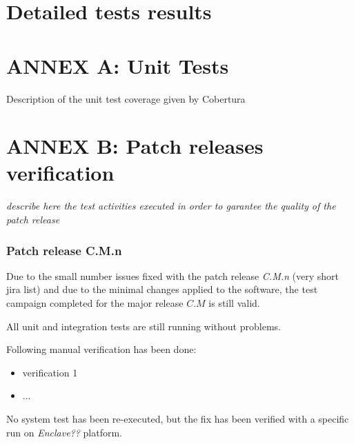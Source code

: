 \documentclass[DM,lsstdraft,STR,toc]{lsstdoc}
\begin{document}
\newpage

\appendix

\newpage
\section{Detailed tests results \label{sect:results}}








\newpage
\section{ANNEX A: Unit Tests \label{sect:unit_tests}}
Description of the unit test coverage given by Cobertura

\newpage
\section{ANNEX B: Patch releases verification}

{\it describe here the test activities executed in order to garantee the quality of the patch release}

\subsubsection{Patch release C.M.n}

Due to the small number issues fixed with the {\it \product} patch release {\it C.M.n} (very short jira list)
and due to the minimal changes applied to the software, the test campaign completed for the {\it \product} major
release $C.M$ is still valid.

All unit and integration tests are still running without problems.

Following manual verification has been done:

\begin{itemize}
\item verification 1
\item ...
\end{itemize}

No system test has been re-executed, but the fix has been verified with a specific run
on {\it Enclave??} platform.
\end{document}

